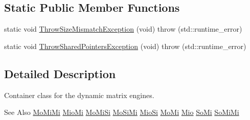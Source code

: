 \subsection*{Static Public Member Functions}
\begin{DoxyCompactItemize}
\item 
static void \hyperlink{classvct_dynamic_matrix_loop_engines_a51089dd3e50ade08ff00100f3f744553}{Throw\-Size\-Mismatch\-Exception} (void)  throw (std\-::runtime\-\_\-error)
\item 
static void \hyperlink{classvct_dynamic_matrix_loop_engines_aecf08e55d6f6cfdd1e9fe4aa91181a21}{Throw\-Shared\-Pointers\-Exception} (void)  throw (std\-::runtime\-\_\-error)
\end{DoxyCompactItemize}


\subsection{Detailed Description}
Container class for the dynamic matrix engines. 

\begin{DoxySeeAlso}{See Also}
\hyperlink{classvct_dynamic_matrix_loop_engines_1_1_mo_mi_mi}{Mo\-Mi\-Mi} \hyperlink{classvct_dynamic_matrix_loop_engines_1_1_mio_mi}{Mio\-Mi} \hyperlink{classvct_dynamic_matrix_loop_engines_1_1_mo_mi_si}{Mo\-Mi\-Si} \hyperlink{classvct_dynamic_matrix_loop_engines_1_1_mo_si_mi}{Mo\-Si\-Mi} \hyperlink{classvct_dynamic_matrix_loop_engines_1_1_mio_si}{Mio\-Si} \hyperlink{classvct_dynamic_matrix_loop_engines_1_1_mo_mi}{Mo\-Mi} \hyperlink{classvct_dynamic_matrix_loop_engines_1_1_mio}{Mio} \hyperlink{classvct_dynamic_matrix_loop_engines_1_1_so_mi}{So\-Mi} \hyperlink{classvct_dynamic_matrix_loop_engines_1_1_so_mi_mi}{So\-Mi\-Mi} 
\end{DoxySeeAlso}


